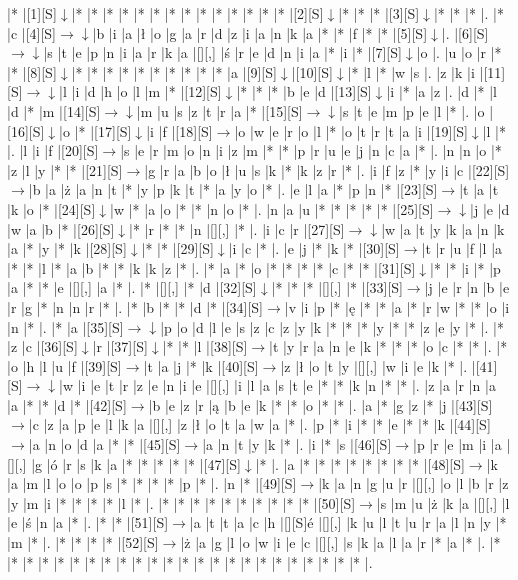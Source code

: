 \documentclass[11pt]{article}
\newcommand\drarr{$\rightarrow \!\!\!\!\! \downarrow$}
\newcommand\rarr{$\rightarrow$}
\newcommand\darr{$\downarrow$}
\begin{document}
\noindent\begin{Puzzle}{23}{30}|*	|[1][S]\darr	|*	|*	|*	|*	|*	|*	|*	|*	|*	|*	|*	|*	|*	|*	|[2][S]\darr	|*	|*	|*	|[3][S]\darr	|*	|*	|*	|.
|*	|c	|[4][S]\drarr	|b	|i	|a	|ł	|o	|g	|a	|r	|d	|z	|i	|a	|n	|k	|a	|*	|*	|f	|*	|*	|[5][S]\darr	|.
|[6][S]\drarr	|s	|t	|e	|p	|n	|i	|a	|r	|k	|a	|[][,]{ }	|ś	|r	|e	|d	|n	|i	|a	|*	|i	|*	|[7][S]\darr	|o	|.
|u	|o	|r	|*	|*	|[8][S]\darr	|*	|*	|*	|*	|*	|*	|*	|*	|*	|*	|a	|[9][S]\darr	|[10][S]\darr	|*	|l	|*	|w	|s	|.
|z	|k	|i	|[11][S]\drarr	|l	|i	|d	|h	|o	|l	|m	|*	|[12][S]\darr	|*	|*	|*	|b	|e	|d	|[13][S]\darr	|i	|*	|a	|z	|.
|d	|*	|l	|d	|*	|m	|[14][S]\drarr	|m	|u	|s	|z	|t	|r	|a	|*	|[15][S]\drarr	|s	|t	|e	|m	|p	|e	|l	|*	|.
|o	|[16][S]\darr	|o	|*	|[17][S]\darr	|i	|f	|[18][S]\rarr	|o	|w	|e	|r	|o	|l	|*	|o	|t	|r	|t	|a	|i	|[19][S]\darr	|l	|*	|.
|l	|i	|f	|[20][S]\rarr	|s	|e	|r	|m	|o	|n	|i	|z	|m	|*	|*	|p	|r	|u	|e	|j	|n	|c	|a	|*	|.
|n	|n	|o	|*	|z	|l	|y	|*	|*	|[21][S]\rarr	|g	|r	|a	|b	|o	|ł	|u	|s	|k	|*	|k	|z	|r	|*	|.
|i	|f	|z	|*	|y	|i	|c	|[22][S]\rarr	|b	|a	|ż	|a	|n	|t	|*	|y	|p	|k	|t	|*	|a	|y	|o	|*	|.
|e	|l	|a	|*	|p	|n	|*	|[23][S]\rarr	|t	|a	|t	|k	|o	|*	|[24][S]\darr	|w	|*	|a	|o	|*	|*	|n	|o	|*	|.
|n	|a	|u	|*	|*	|*	|*	|*	|[25][S]\drarr	|j	|e	|d	|w	|a	|b	|*	|[26][S]\darr	|*	|r	|*	|*	|n	|[][,]{ }	|*	|.
|i	|c	|r	|[27][S]\drarr	|w	|a	|t	|y	|k	|a	|n	|k	|a	|*	|y	|*	|k	|[28][S]\darr	|*	|*	|[29][S]\darr	|i	|c	|*	|.
|e	|j	|*	|k	|*	|[30][S]\rarr	|t	|r	|u	|f	|l	|a	|*	|*	|l	|*	|a	|b	|*	|*	|k	|k	|z	|*	|.
|*	|a	|*	|o	|*	|*	|*	|*	|c	|*	|*	|[31][S]\darr	|*	|*	|i	|*	|p	|a	|*	|*	|e	|[][,]{ }	|a	|*	|.
|*	|[][,]{ }	|*	|d	|[32][S]\darr	|*	|*	|*	|[][,]{ }	|*	|[33][S]\rarr	|j	|e	|r	|n	|b	|e	|r	|g	|*	|n	|n	|r	|*	|.
|*	|b	|*	|*	|d	|*	|[34][S]\rarr	|v	|i	|p	|*	|ę	|*	|*	|a	|*	|r	|w	|*	|*	|o	|i	|n	|*	|.
|*	|a	|[35][S]\drarr	|p	|o	|d	|l	|e	|s	|z	|c	|z	|y	|k	|*	|*	|*	|y	|*	|*	|z	|e	|y	|*	|.
|*	|z	|c	|[36][S]\darr	|r	|[37][S]\darr	|*	|*	|l	|[38][S]\rarr	|t	|y	|r	|a	|n	|e	|k	|*	|*	|*	|o	|c	|*	|*	|.
|*	|o	|h	|l	|u	|f	|[39][S]\rarr	|t	|a	|j	|*	|k	|[40][S]\rarr	|z	|ł	|o	|t	|y	|[][,]{ }	|w	|i	|e	|k	|*	|.
|[41][S]\drarr	|w	|i	|e	|t	|r	|z	|e	|n	|i	|e	|[][,]{ }	|i	|l	|a	|s	|t	|e	|*	|*	|k	|n	|*	|*	|.
|z	|a	|r	|n	|a	|a	|*	|*	|d	|*	|[42][S]\rarr	|b	|e	|z	|r	|ą	|b	|e	|k	|*	|*	|o	|*	|*	|.
|a	|*	|g	|z	|*	|j	|[43][S]\rarr	|c	|z	|a	|p	|e	|l	|k	|a	|[][,]{ }	|z	|ł	|o	|t	|a	|w	|a	|*	|.
|p	|*	|i	|*	|*	|e	|*	|*	|k	|[44][S]\rarr	|a	|n	|o	|d	|a	|*	|*	|[45][S]\rarr	|a	|n	|t	|y	|k	|*	|.
|i	|*	|s	|[46][S]\rarr	|p	|r	|e	|m	|i	|a	|[][,]{ }	|g	|ó	|r	|s	|k	|a	|*	|*	|*	|*	|*	|[47][S]\darr	|*	|.
|a	|*	|*	|*	|*	|*	|*	|*	|*	|[48][S]\rarr	|k	|a	|m	|l	|o	|o	|p	|s	|*	|*	|*	|*	|p	|*	|.
|n	|*	|[49][S]\rarr	|k	|a	|n	|g	|u	|r	|[][,]{ }	|o	|l	|b	|r	|z	|y	|m	|i	|*	|*	|*	|*	|l	|*	|.
|*	|*	|*	|*	|*	|*	|*	|*	|*	|*	|[50][S]\rarr	|s	|m	|u	|ż	|k	|a	|[][,]{ }	|l	|e	|ś	|n	|a	|*	|.
|*	|*	|[51][S]\rarr	|a	|t	|t	|a	|c	|h	|[][S]é	|[][,]{ }	|k	|u	|l	|t	|u	|r	|a	|l	|n	|y	|*	|m	|*	|.
|*	|*	|*	|*	|[52][S]\rarr	|ż	|a	|g	|l	|o	|w	|i	|e	|c	|[][,]{ }	|s	|k	|a	|l	|a	|r	|*	|a	|*	|.
|*	|*	|*	|*	|*	|*	|*	|*	|*	|*	|*	|*	|*	|*	|*	|*	|*	|*	|*	|*	|*	|*	|*	|*	|.\end{Puzzle}
\end{document}

